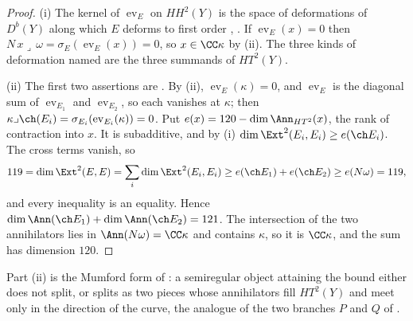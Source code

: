 \begin{proof}
(i) The kernel of $\operatorname{ev}_{E}$ on $HH^{2}(Y)$ is the space of
deformations of $D^{b}(Y)$ along which $E$ deforms to first order
\cite{Tod09}, \cite[Section~8.3]{Mar25a}. If $\operatorname{ev}_{E}(x)=0$ then
$N\,x\lrcorner\,\omega=\sigma_{E}(\operatorname{ev}_{E}(x))=0$, so
$x\in\CC\kappa$ by (ii). The three kinds of
deformation named are the three summands of $HT^{2}(Y)$.

(ii) The first two assertions are . By
(ii), $\operatorname{ev}_{E}(\kappa)=0$, and
$\operatorname{ev}_{E}$ is the diagonal sum of $\operatorname{ev}_{E_{1}}$
and $\operatorname{ev}_{E_{2}}$, so each vanishes at $\kappa$; then
$\kappa\lrcorner\ch(E_{i})=\sigma_{E_{i}}(\operatorname{ev}_{E_{i}}(\kappa))
=0$. Put $e(x)=120-\dim\Ann_{HT^{2}}(x)$, the rank of contraction into $x$.
It is subadditive, and by (i)
$\dim\Ext^{2}(E_{i},E_{i})\ge e(\ch E_{i})$. The cross terms vanish, so
\[
  119=\dim\Ext^{2}(E,E)=\sum_{i}\dim\Ext^{2}(E_{i},E_{i})
  \ge e(\ch E_{1})+e(\ch E_{2})\ge e(N\omega)=119,
\]
and every inequality is an equality. Hence
$\dim\Ann(\ch E_{1})+\dim\Ann(\ch E_{2})=121$. The intersection of the two
annihilators lies in $\Ann(N\omega)=\CC\kappa$ and contains $\kappa$, so it is
$\CC\kappa$, and the sum has dimension $120$.
\end{proof}

Part (ii) is the Mumford form of : a semiregular object
attaining the bound either does not split, or splits as two pieces whose
annihilators fill $HT^{2}(Y)$ and meet only in the direction of the curve, the
analogue of the two branches $P$ and $Q$ of .

